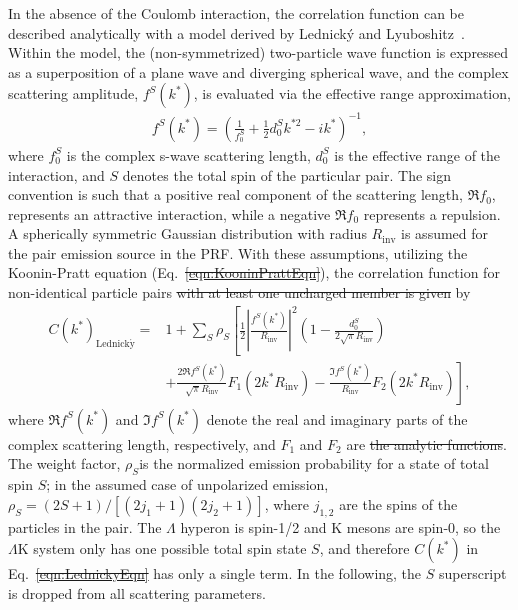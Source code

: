 \documentclass[ALICE,manyauthors]{cernphprep}
\newcommand{\Lam}{$\Lambda$\xspace}
\newcommand{\LamK}{$\Lambda$K\xspace}
\providecommand{\DIFaddtex}[1]{{\protect\color{blue}\uwave{#1}}} %
\providecommand{\DIFdeltex}[1]{{\protect\color{red}\sout{#1}}}                      %
\providecommand{\DIFaddbegin}{} %
\providecommand{\DIFaddend}{} %
\providecommand{\DIFdelbegin}{} %
\providecommand{\DIFdelend}{} %
\providecommand{\DIFadd}[1]{\texorpdfstring{\DIFaddtex{#1}}{#1}} %
\providecommand{\DIFdel}[1]{\texorpdfstring{\DIFdeltex{#1}}{}} %
\begin{document}
In the absence of the Coulomb interaction, the correlation function can be described analytically with a model derived by Lednick\'y and Lyuboshitz~\cite{Lednicky:82}.
Within the model, the (non-symmetrized) two-particle wave function is expressed as a superposition of a plane wave and diverging spherical wave, and the complex scattering amplitude, $f^{S}(k^{*})$, is evaluated via the effective range approximation,
\begin{equation}
\begin{aligned}
f^{S}(k^{*}) = \left( \frac{1}{f^{S}_{0}} + \frac{1}{2}d^{S}_{0}k^{*2} - ik^{*} \right)^{-1},
\end{aligned}
\label{eqn:ScatteringParam}
\end{equation}
where $f^{S}_{0}$ is the complex s-wave scattering length, $d^{S}_{0}$ is the effective range of the interaction, and $S$ denotes the total spin of the particular pair.
The sign convention is such that a positive real component of the scattering length, $\Re f_{0}$, represents an attractive interaction, while a negative \DIFdelbegin \DIFdel{$\Re f_{0}$ }\DIFdelend \DIFaddbegin \DIFadd{value }\DIFaddend represents a repulsion.
A spherically symmetric Gaussian distribution with radius $R_{\mathrm{inv}}$  is assumed for the pair emission source in the PRF.
With these assumptions, utilizing the Koonin-Pratt equation (Eq.~\DIFdelbegin \DIFdel{\ref{eqn:KooninPrattEqn}}\DIFdelend \DIFaddbegin \DIFadd{(\ref{eqn:KooninPrattEqn})}\DIFaddend ), the correlation function for non-identical particle pairs \DIFdelbegin \DIFdel{with at least one uncharged member is given }\DIFdelend \DIFaddbegin \DIFadd{is modeled }\DIFaddend by~\cite{Lednicky:82}
\begin{equation}
\begin{aligned}
C(k^{*})_{\mathrm{Lednick\acute{y}}} = &1 + \sum_{S}\rho_{S}\left[\frac{1}{2}\left|\frac{f^{S}(k^{*})}{R_{\mathrm{inv}}}\right|^2\left(1-\frac{d^{S}_{0}}{2\sqrt{\pi}R_{\mathrm{inv}}}\right) \right. \\
&+ \left. \frac{2\Re f^{S}(k^{*})}{\sqrt{\pi}R_{\mathrm{inv}}}F_{1}(2k^{*}R_{\mathrm{inv}})-\frac{\Im f^{S}(k^{*})}{R_{\mathrm{inv}}}F_{2}(2k^{*}R_{\mathrm{inv}})\right],
\end{aligned}  
\label{eqn:LednickyEqn}
\end{equation}
where $\Re f^{S}(k^{*})$ and $\Im f^{S}(k^{*})$ denote the real and imaginary parts of the complex scattering length, respectively, and $F_{1}$ and $F_{2}$ are \DIFdelbegin \DIFdel{the analytic functions}\DIFdelend \DIFaddbegin \DIFadd{analytic functions~\mbox{%
\cite{Lednicky:82}}%
}\DIFaddend .
The weight factor, $\rho_{S}$\DIFaddbegin \DIFadd{, }\DIFaddend is the normalized emission probability for a state of total spin $S$; in the assumed case of unpolarized emission, $\rho_{S} = (2S+1)/[(2j_{1}+1)(2j_{2}+1)]$, where $j_{1,2}$ are the spins of the particles in the pair.
The \Lam hyperon is spin-1/2 and K mesons are spin-0, so the \LamK system only has one possible total spin state $S$, and therefore $C(k^{*})$ in Eq.~\DIFdelbegin \DIFdel{\ref{eqn:LednickyEqn} }\DIFdelend \DIFaddbegin \DIFadd{(\ref{eqn:LednickyEqn}) }\DIFaddend has only a single term.
In the following, the $S$ superscript is dropped from all scattering parameters.
\end{document}
